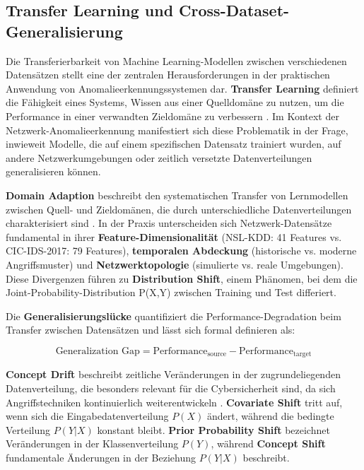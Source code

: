 \documentclass[11pt,a4paper]{article}
\begin{document}
    \subsection{Transfer Learning und Cross-Dataset-Generalisierung}

    Die Transferierbarkeit von Machine Learning-Modellen zwischen verschiedenen Datensätzen stellt eine der zentralen Herausforderungen in der praktischen Anwendung von Anomalieerkennungssystemen dar. \textbf{Transfer Learning} definiert die Fähigkeit eines Systems, Wissen aus einer Quelldomäne zu nutzen, um die Performance in einer verwandten Zieldomäne zu verbessern \parencite{Goodfellow2016}. Im Kontext der Netzwerk-Anomalieerkennung manifestiert sich diese Problematik in der Frage, inwieweit Modelle, die auf einem spezifischen Datensatz trainiert wurden, auf andere Netzwerkumgebungen oder zeitlich versetzte Datenverteilungen generalisieren können.

    \textbf{Domain Adaption} beschreibt den systematischen Transfer von Lernmodellen zwischen Quell- und Zieldomänen, die durch unterschiedliche Datenverteilungen charakterisiert sind \parencite{Goodfellow2016}. In der Praxis unterscheiden sich Netzwerk-Datensätze fundamental in ihrer \textbf{Feature-Dimensionalität} (NSL-KDD: 41 Features vs. CIC-IDS-2017: 79 Features), \textbf{temporalen Abdeckung} (historische vs. moderne Angriffsmuster) und \textbf{Netzwerktopologie} (simulierte vs. reale Umgebungen). Diese Divergenzen führen zu \textbf{Distribution Shift}, einem Phänomen, bei dem die Joint-Probability-Distribution P(X,Y) zwischen Training und Test differiert.

    Die \textbf{Generalisierungslücke} quantifiziert die Performance-Degradation beim Transfer zwischen Datensätzen und lässt sich formal definieren als:

    \begin{equation}
        \text{Generalization Gap} = \text{Performance}_{\text{source}} - \text{Performance}_{\text{target}}
    \end{equation}

    \textbf{Concept Drift} beschreibt zeitliche Veränderungen in der zugrundeliegenden Datenverteilung, die besonders relevant für die Cybersicherheit sind, da sich Angriffstechniken kontinuierlich weiterentwickeln \parencite{Ring2019}. \textbf{Covariate Shift} tritt auf, wenn sich die Eingabedatenverteilung $P(X)$ ändert, während die bedingte Verteilung $P(Y|X)$ konstant bleibt. \textbf{Prior Probability Shift} bezeichnet Veränderungen in der Klassenverteilung $P(Y)$, während \textbf{Concept Shift} fundamentale Änderungen in der Beziehung $P(Y|X)$ beschreibt.
\end{document}
